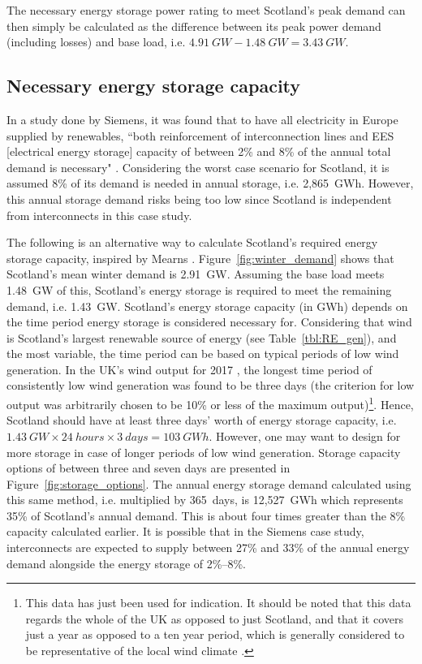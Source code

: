 The necessary energy storage power rating to meet Scotland's peak demand can then simply be calculated as the difference between its peak power demand (including losses) and base load, i.e. $4.91~GW - 1.48~GW = 3.43~GW$.




\subsection{Necessary energy storage capacity}

In a study done by Siemens, it was found that to have all electricity in Europe supplied by renewables, ``both reinforcement of interconnection lines and EES [electrical energy storage] capacity of between 2\% and 8\% of the annual total demand is necessary" \citep[p.~69]{IEC2011}.
Considering the worst case scenario for Scotland, it is assumed 8\% of its demand is needed in annual storage, i.e. 2,865~GWh.
However, this annual storage demand risks being too low since Scotland is independent from interconnects in this case study.

The following is an alternative way to calculate Scotland's required energy storage capacity, inspired by Mearns \citep{Mearns2018}.
Figure~\ref{fig:winter_demand} shows that Scotland's mean winter demand is 2.91~GW.
Assuming the base load meets 1.48~GW of this, Scotland's energy storage is required to meet the remaining demand, i.e. 1.43~GW.
Scotland's energy storage capacity (in GWh) depends on the time period energy storage is considered necessary for.
Considering that wind is Scotland's largest renewable source of energy (see Table~\ref{tbl:RE_gen}), and the most variable, the time period can be based on typical periods of low wind generation.
In the UK's wind output for 2017 \citep{GridWatchnd}, the longest time period of consistently low wind generation was found to be three days (the criterion for low output was arbitrarily chosen to be 10\% or less of the maximum output)\footnote{This data has just been used for indication. It should be noted that this data regards the whole of the UK as opposed to just Scotland, and that it covers just a year as opposed to a ten year period, which is generally considered to be representative of the local wind climate \citep[p.~15]{Boehme2006}.}.
Hence, Scotland should have at least three days' worth of energy storage capacity, i.e. $1.43~GW \times 24~hours \times 3~days = 103~GWh$.
However, one may want to design for more storage in case of longer periods of low wind generation.
Storage capacity options of between three and seven days are presented in Figure~\ref{fig:storage_options}.
The annual energy storage demand calculated using this same method, i.e. multiplied by 365~days, is 12,527~GWh which represents 35\% of Scotland's annual demand.
This is about four times greater than the 8\% capacity calculated earlier.
It is possible that in the Siemens case study, interconnects are expected to supply between 27\% and 33\% of the annual energy demand alongside the energy storage of 2\%--8\%.

